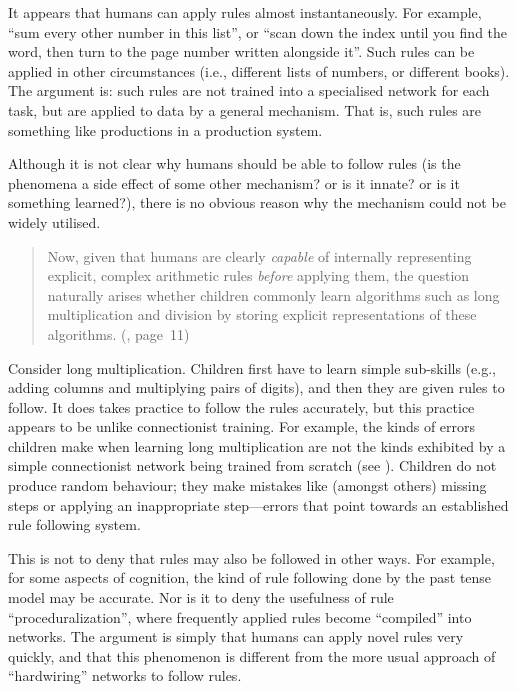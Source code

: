 It appears that humans can apply rules almost instantaneously.
For example, ``sum every other number in this list'', or ``scan
down the index until you find the word, then turn to the page
number written alongside it''.  
Such rules can be applied in other
circumstances (i.e., different lists of numbers, or
different books).  The argument is: such rules are not trained into
a specialised network for each task, but are applied to data by a
general mechanism.  That is, such rules are something like
productions in a production system.

Although it is not clear why humans should be able to follow rules
(is the phenomena a side effect of some other mechanism? or is it
innate? or is it something learned?), there is no obvious reason
why the mechanism could not be widely utilised.
\begin{quotation}\small
Now, given that humans are clearly {\em capable} of internally
representing explicit, complex arithmetic rules {\em before}
applying them, the question naturally arises whether children
commonly learn algorithms such as long multiplication and division
by storing explicit representations of these algorithms.
\flushright (, page~11)
\end{quotation}

Consider long multiplication.  Children first have to learn simple
sub-skills (e.g., adding columns and multiplying pairs of digits),
and then they are given rules to follow.  It does takes practice to
follow the rules accurately, but this practice appears to be
unlike connectionist training. For example,
the kinds of errors children make when learning long
multiplication are not the kinds exhibited by a simple
connectionist network being trained from scratch
(see ).  Children do not
produce random behaviour; they make mistakes like (amongst others)
missing steps or applying an inappropriate step---errors that
point towards an established rule following system.

This is not to deny that rules may also be followed in other ways.
For example, for some aspects of cognition, the kind of rule
following done by the  past tense model may be
accurate.  Nor is it to deny the usefulness of rule
``proceduralization'', where frequently applied rules become
``compiled'' into networks.  The argument is simply that humans
can apply novel rules very quickly, and that this phenomenon is
different from the more usual approach of ``hardwiring'' networks
to follow rules.

